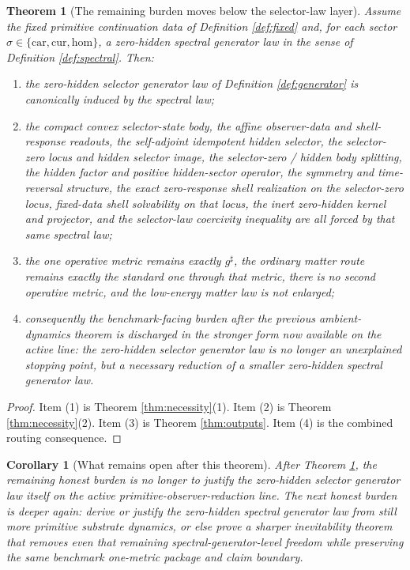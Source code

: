 \documentclass[11pt]{article}
\newcommand{\CompletedMetric}{g^{\sharp}}
\newcommand{\Car}{\mathrm{car}}
\newcommand{\Cur}{\mathrm{cur}}
\newcommand{\Hom}{\mathrm{hom}}
\newtheorem{corollary}{Corollary}
\newtheorem{theorem}{Theorem}
\begin{document}
\begin{theorem}[The remaining burden moves below the selector-law layer]
\label{thm:main}
Assume the fixed primitive continuation data of Definition \ref{def:fixed} and, for each sector \(\sigma\in\{\Car,\Cur,\Hom\}\), a zero-hidden spectral generator law in the sense of Definition \ref{def:spectral}. Then:
\begin{enumerate}
    \item the zero-hidden selector generator law of Definition \ref{def:generator} is canonically induced by the spectral law;
    \item the compact convex selector-state body, the affine observer-data and shell-response readouts, the self-adjoint idempotent hidden selector, the selector-zero locus and hidden selector image, the selector-zero / hidden body splitting, the hidden factor and positive hidden-sector operator, the symmetry and time-reversal structure, the exact zero-response shell realization on the selector-zero locus, fixed-data shell solvability on that locus, the inert zero-hidden kernel and projector, and the selector-law coercivity inequality are all forced by that same spectral law;
    \item the one operative metric remains exactly \(\CompletedMetric\), the ordinary matter route remains exactly the standard one through that metric, there is no second operative metric, and the low-energy matter law is not enlarged;
    \item consequently the benchmark-facing burden after the previous ambient-dynamics theorem is discharged in the stronger form now available on the active line: the zero-hidden selector generator law is no longer an unexplained stopping point, but a necessary reduction of a smaller zero-hidden spectral generator law.
\end{enumerate}
\end{theorem}

\begin{proof}
Item (1) is Theorem \ref{thm:necessity}(1). Item (2) is Theorem \ref{thm:necessity}(2). Item (3) is Theorem \ref{thm:outputs}. Item (4) is the combined routing consequence.
\end{proof}

\begin{corollary}[What remains open after this theorem]
\label{cor:next}
After Theorem \ref{thm:main}, the remaining honest burden is no longer to justify the zero-hidden selector generator law itself on the active primitive-observer-reduction line. The next honest burden is deeper again: derive or justify the zero-hidden spectral generator law from still more primitive substrate dynamics, or else prove a sharper inevitability theorem that removes even that remaining spectral-generator-level freedom while preserving the same benchmark one-metric package and claim boundary.
\end{corollary}
\end{document}

